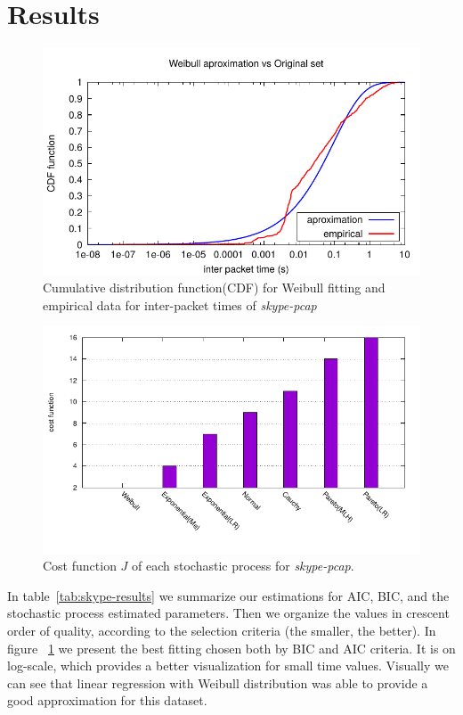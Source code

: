 \section{Results}
\begin{figure}[t]
{\centering
\includegraphics[width=\columnwidth]{figures/Weibull}
\caption{Cumulative distribution function(CDF) for Weibull fitting and empirical data for inter-packet times of \textit{skype-pcap}}
\label{fig:skype-weibull}\par}
\end{figure}
\begin{figure}[b]
{\centering
\includegraphics[width=\columnwidth]{figures/costFunction2}
\caption{Cost function $J$ of each stochastic process for \textit{skype-pcap}.}
\label{fig:cost-function}\par}
\end{figure}
In table~\ref{tab:skype-results} we summarize our estimations for AIC, BIC, and the stochastic process estimated parameters. Then we organize the values in crescent order of quality, according to the selection criteria (the smaller, the better). In figure ~\ref{fig:skype-weibull} we present the best fitting chosen both by BIC and AIC criteria. It is on log-scale, which provides a better visualization for small time values. Visually we can see that linear regression with Weibull distribution was able to provide a good approximation for this dataset.

